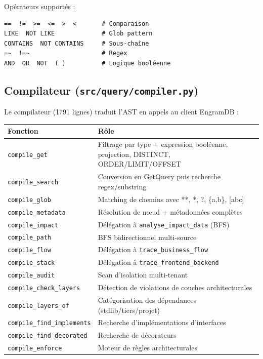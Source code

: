 \documentclass[12pt,a4paper]{article}
\newcommand{\code}[1]{\texttt{#1}}
\begin{document}
Opérateurs supportés :
\begin{lstlisting}
==  !=  >=  <=  >  <       # Comparaison
LIKE  NOT LIKE             # Glob pattern
CONTAINS  NOT CONTAINS     # Sous-chaîne
=~  !=~                    # Regex
AND  OR  NOT  ( )          # Logique booléenne
\end{lstlisting}

\subsection{Compilateur (\code{src/query/compiler.py})}

Le compilateur (1791 lignes) traduit l'AST en appels au client EngramDB :

\begin{center}
\begin{tabularx}{\textwidth}{lX}
\toprule
\textbf{Fonction} & \textbf{Rôle} \\
\midrule
\code{compile\_get} & Filtrage par type + expression booléenne, projection, DISTINCT, ORDER/LIMIT/OFFSET \\
\code{compile\_search} & Conversion en GetQuery puis recherche regex/substring \\
\code{compile\_glob} & Matching de chemins avec **, *, ?, \{a,b\}, [abc] \\
\code{compile\_metadata} & Résolution de nœud + métadonnées complètes \\
\code{compile\_impact} & Délégation à \code{analyse\_impact\_data} (BFS) \\
\code{compile\_path} & BFS bidirectionnel multi-source \\
\code{compile\_flow} & Délégation à \code{trace\_business\_flow} \\
\code{compile\_stack} & Délégation à \code{trace\_frontend\_backend} \\
\code{compile\_audit} & Scan d'isolation multi-tenant \\
\code{compile\_check\_layers} & Détection de violations de couches architecturales \\
\code{compile\_layers\_of} & Catégorisation des dépendances (stdlib/tiers/projet) \\
\code{compile\_find\_implements} & Recherche d'implémentations d'interfaces \\
\code{compile\_find\_decorated} & Recherche de décorateurs \\
\code{compile\_enforce} & Moteur de règles architecturales \\
\bottomrule
\end{tabularx}
\end{center}
\end{document}
